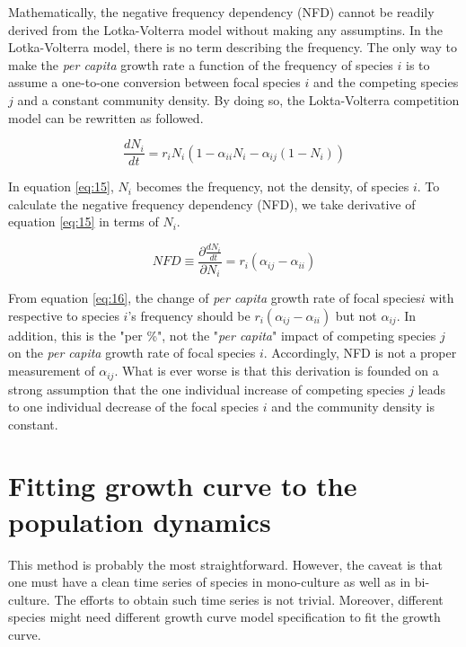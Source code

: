 \documentclass[fleqn]{article}
\begin{document}
Mathematically, the negative frequency dependency (NFD) cannot be readily derived from the Lotka-Volterra model without making any assumptins. In the Lotka-Volterra model, there is no term describing the frequency. The only way to make the \textit{per capita} growth rate a function of the frequency of species $i$ is to assume a one-to-one conversion between focal species $i$ and the competing species $j$ and a constant community density. By doing so, the Lokta-Volterra competition model can be rewritten as followed. 

\begin{equation}\label{eq:15}
 \frac{dN_i}{dt} = r_iN_i(1 - \alpha_{ii}N_i - \alpha_{ij}(1-N_i))
\end{equation}

In equation \ref{eq:15}, $N_i$ becomes the frequency, not the density, of species $i$. To calculate the negative frequency dependency (NFD), we take derivative of equation \ref{eq:15} in terms of $N_i$. 

\begin{equation}\label{eq:16}
 NFD \equiv \frac{\partial \frac{dN_i}{dt}}{\partial N_i} = r_i(\alpha_{ij} - \alpha_{ii})
\end{equation}

\noindent From equation \ref{eq:16}, the change of \textit{per capita} growth rate of focal species$i$ with respective to species $i$'s frequency should be $r_i(\alpha_{ij} - \alpha_{ii})$ but not $\alpha_{ij}$. In addition, this is the "per \%", not the "\textit{per capita}" impact of competing species $j$ on the \textit{per capita} growth rate of focal species $i$. Accordingly, NFD is not a proper measurement of $\alpha_{ij}$. What is ever worse is that this derivation is founded on a strong assumption that the one individual increase of competing species $j$ leads to one individual decrease of the focal species $i$ and the community density is constant. 

\newpage
\section{Fitting growth curve to the population dynamics}

This method is probably the most straightforward. However, the caveat is that one must have a clean time series of species in mono-culture as well as in bi-culture. The efforts to obtain such time series is not trivial. Moreover, different species might need different growth curve model specification to fit the growth curve. 

\newpage


\end{document}
